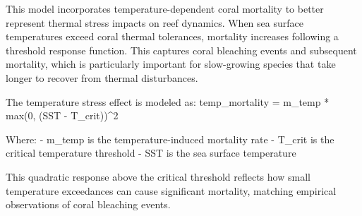 This model incorporates temperature-dependent coral mortality to better represent thermal stress impacts on reef dynamics. When sea surface temperatures exceed coral thermal tolerances, mortality increases following a threshold response function. This captures coral bleaching events and subsequent mortality, which is particularly important for slow-growing species that take longer to recover from thermal disturbances.

The temperature stress effect is modeled as:
temp_mortality = m_temp * max(0, (SST - T_crit))^2

Where:
- m_temp is the temperature-induced mortality rate
- T_crit is the critical temperature threshold
- SST is the sea surface temperature

This quadratic response above the critical threshold reflects how small temperature exceedances can cause significant mortality, matching empirical observations of coral bleaching events.
